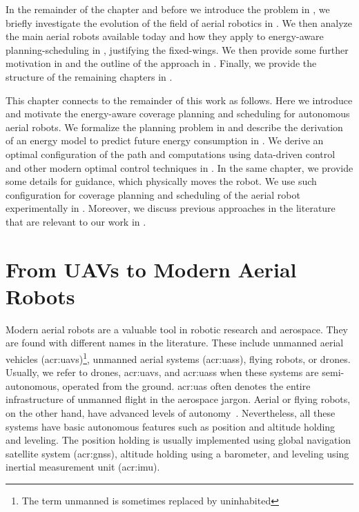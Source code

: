 In the remainder of the chapter and before we introduce the problem in , we briefly investigate the evolution of the field of aerial robotics in . We then analyze the main aerial robots available today and how they apply to energy-aware planning-scheduling in , justifying the fixed-wings. We then provide some further motivation in  and the outline of the approach in . Finally, we provide the structure of the remaining chapters in .

This chapter connects to the remainder of this work as follows. Here we introduce and motivate the energy-aware coverage planning and scheduling for autonomous aerial robots. We formalize the planning problem in  and describe the derivation of an energy model to predict future energy consumption in . We derive an optimal configuration of the path and computations using data-driven control and other modern optimal control techniques in . In the same chapter, we provide some details for guidance, which physically moves the robot. We use such configuration for coverage planning and scheduling of the aerial robot experimentally in . Moreover, we discuss previous approaches in the literature that are relevant to our work in . 



\section{From UAVs to Modern Aerial Robots}
\label{sec:history}

Modern aerial robots are a valuable tool in robotic research and aerospace. They are found with different names in the literature. These include unmanned aerial vehicles (\Gls{acr:uav}s)\footnote{The term unmanned is sometimes replaced by uninhabited}, unmanned aerial systems (\Gls{acr:uas}s), flying robots, or drones. Usually, we refer to drones, \Gls{acr:uav}s, and \Gls{acr:uas}s when these systems are semi-autonomous, operated from the ground. \Gls{acr:uas} often denotes the entire infrastructure of unmanned flight in the aerospace jargon. Aerial or flying robots, on the other hand, have advanced levels of autonomy~\citep{siciliano2016springer}. Nevertheless, all these systems have basic autonomous features such as position and altitude holding and leveling. The position holding is usually implemented using global navigation satellite system (\Gls{acr:gnss}), altitude holding using a barometer, and leveling using inertial measurement unit (\Gls{acr:imu}).

